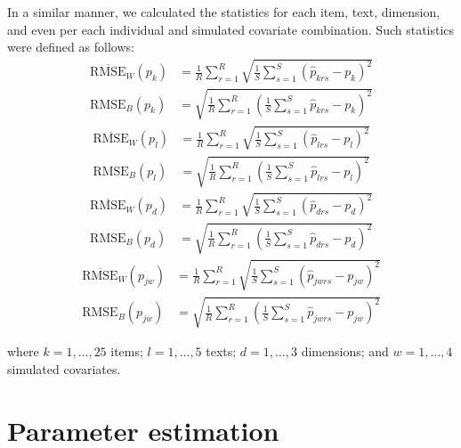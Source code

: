 In a similar manner, we calculated the statistics for each item, text, dimension, and even per each individual and simulated covariate combination. Such statistics were defined as follows:
%
\begin{align}
	\overline{\text{RMSE}}_{W} \left( p_{k} \right) &= \frac{1}{R} \sum_{r=1}^{R} \sqrt{ \frac{1}{S} \sum_{s=1}^{S} \left( \hat{p}_{krs} - p_{k} \right)^2} \\
	\text{RMSE}_{B} \left( p_{k} \right) &= \sqrt{ \frac{1}{R} \sum_{r=1}^{R}  \left( \frac{1}{S} \sum_{s=1}^{S} \hat{p}_{krs} - p_{k} \right)^2} 
\end{align}
%
\begin{align}
	\overline{\text{RMSE}}_{W} \left( p_{l} \right) &= \frac{1}{R} \sum_{r=1}^{R} \sqrt{ \frac{1}{S} \sum_{s=1}^{S} \left( \hat{p}_{lrs} - p_{l} \right)^2} \\
	\text{RMSE}_{B} \left( p_{l} \right) &= \sqrt{ \frac{1}{R} \sum_{r=1}^{R}  \left( \frac{1}{S} \sum_{s=1}^{S} \hat{p}_{lrs} - p_{l} \right)^2} 
\end{align}
%
\begin{align}
	\overline{\text{RMSE}}_{W} \left( p_{d} \right) &= \frac{1}{R} \sum_{r=1}^{R} \sqrt{ \frac{1}{S} \sum_{s=1}^{S} \left( \hat{p}_{drs} - p_{d} \right)^2} \\
	\text{RMSE}_{B} \left( p_{d} \right) &= \sqrt{ \frac{1}{R} \sum_{r=1}^{R}  \left( \frac{1}{S} \sum_{s=1}^{S} \hat{p}_{drs} - p_{d} \right)^2} 
\end{align}
%
\begin{align}
	\overline{\text{RMSE}}_{W} \left( p_{jw} \right) &= \frac{1}{R} \sum_{r=1}^{R} \sqrt{ \frac{1}{S} \sum_{s=1}^{S} \left( \hat{p}_{jwrs} - p_{jw} \right)^2} \\
	\text{RMSE}_{B} \left( p_{jw} \right) &= \sqrt{ \frac{1}{R} \sum_{r=1}^{R}  \left( \frac{1}{S} \sum_{s=1}^{S} \hat{p}_{jwrs} - p_{jw} \right)^2} 
\end{align}

\noindent where $k= 1, \dots, 25$ items; $l=1, \dots, 5$ texts; $d=1, \dots ,3$ dimensions; and $w=1, \dots, 4$ simulated covariates.


\section{Parameter estimation}

